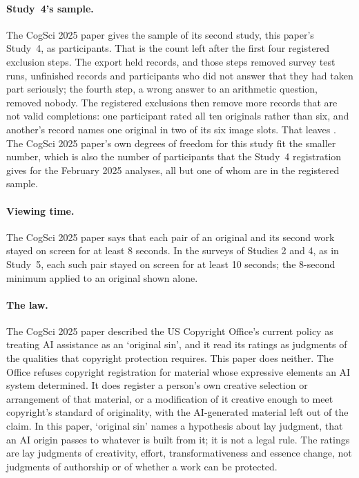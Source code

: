 \paragraph*{Study~4's sample.}
The CogSci 2025 paper gives the sample of its second study, this paper's Study~4, as \SFourNBeforeValidity{} participants. That is the count left after the first four registered exclusion steps. The export held \SFourNRecords{} records, and those steps removed \SFourNPreviewRemoved{} survey test runs, \SFourNUnfinishedRemoved{} unfinished records and \SFourNNotSeriousRemoved{} participants who did not answer that they had taken part seriously; the fourth step, a wrong answer to an arithmetic question, removed nobody. The registered exclusions then remove \SFourNInvalidRemoved{} more records that are not valid completions: one participant rated all ten originals rather than six, and another's record names one original in two of its six image slots. That leaves \SFourN. The CogSci 2025 paper's own degrees of freedom for this study fit the smaller number, which is also the number of participants that the Study~4 registration gives for the February 2025 analyses, all but one of whom are in the registered sample.

\paragraph*{Viewing time.}
The CogSci 2025 paper says that each pair of an original and its second work stayed on screen for at least 8 seconds. In the surveys of Studies 2 and 4, as in Study~5, each such pair stayed on screen for at least 10 seconds; the 8-second minimum applied to an original shown alone.

\paragraph*{The law.}
The CogSci 2025 paper described the US Copyright Office's current policy as treating AI assistance as an `original sin', and it read its ratings as judgments of the qualities that copyright protection requires. This paper does neither. The Office refuses copyright registration for material whose expressive elements an AI system determined. It does register a person's own creative selection or arrangement of that material, or a modification of it creative enough to meet copyright's standard of originality, with the AI-generated material left out of the claim.\cite{usco2023guidance,usco2025copyrightability} In this paper, `original sin' names a hypothesis about lay judgment, that an AI origin passes to whatever is built from it; it is not a legal rule. The ratings are lay judgments of creativity, effort, transformativeness and essence change, not judgments of authorship or of whether a work can be protected.

